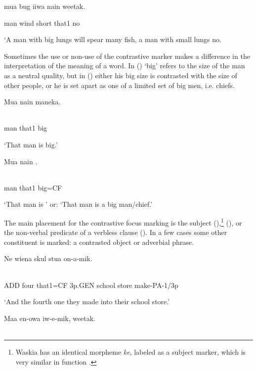mua  bug  iiwa  nain  weetak.

man  wind  short  that1  no

`A man with big lungs will spear many fish, a man with small lungs no. 

Sometimes the use or non-use of the contrastive marker makes a difference in the interpretation of the meaning of a word. In ()  `big' refers to the size of the man as a neutral quality, but in () either his big size is contrasted with the size of other people, or he is set apart as one of a limited set of big men, i.e. chiefs. 

\ea%
\label{ex:x1690}
\gll Mua  nain  maneka. \\
      \\
\glt
\z

man  that1  big

`That man is big.'

\ea%
\label{ex:x1691}
\gll Mua  nain  . \\
      \\
\glt
\z

man  that1  big=CF

`That man is \textsc{'} or: `That man is a big man/chief.'

The main placement for the contrastive focus marking is the subject (),\footnote{Waskia has an identical morpheme \textit{ke}, labeled as a subject marker, which is very similar in function \citep[36]{RossEtAl1978}%
.} (), or the non-verbal predicate of a verbless clause (). In a few cases some other constituent is marked: a contrasted object or adverbial phrase.

\ea%
\label{ex:x1692}
\gll Ne    wiena  skul  stua  on-a-mik. \\
      \\
\glt
\z

ADD  four  that1=CF  3p.GEN  school  store  make-PA-1/3p

`And the fourth one they made into their school store.'

\ea%
\label{ex:x1697}
\gll Maa  en-owa  iw-e-mik,    weetak. \\
      \\
\glt
\z

